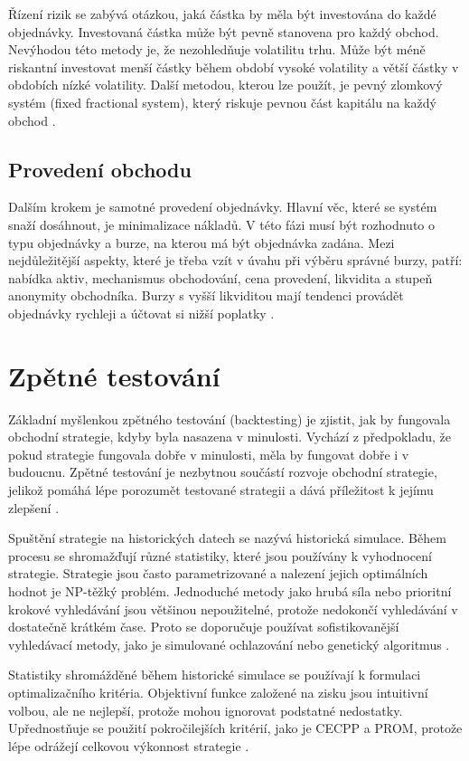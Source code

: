 Řízení rizik se zabývá otázkou, jaká částka by měla být investována do každé objednávky.
Investovaná částka může být pevně stanovena pro každý obchod.
Nevýhodou této metody je, že nezohledňuje volatilitu trhu.
Může být méně riskantní investovat menší částky během období vysoké volatility a větší částky v obdobích nízké volatility.
Další metodou, kterou lze použít, je pevný zlomkový systém (fixed fractional system), který riskuje pevnou část kapitálu na každý obchod \cite{nuti}.

\section{Provedení obchodu}
Dalším krokem je samotné provedení objednávky.
Hlavní věc, které se systém snaží dosáhnout, je minimalizace nákladů.
V této fázi musí být rozhodnuto o typu objednávky a burze, na kterou má být objednávka zadána.
Mezi nejdůležitější aspekty, které je třeba vzít v úvahu při výběru správné burzy, patří: nabídka aktiv, mechanismus obchodování, cena provedení, likvidita a stupeň anonymity obchodníka.
Burzy s vyšší likviditou mají tendenci provádět objednávky rychleji a účtovat si nižší poplatky \cite{nuti}.

\chapter{Zpětné testování}
Základní myšlenkou zpětného testování (backtesting) je zjistit, jak by fungovala obchodní strategie, kdyby byla nasazena v minulosti.
Vychází z předpokladu, že pokud strategie fungovala dobře v minulosti, měla by fungovat dobře i v budoucnu.
Zpětné testování je nezbytnou součástí rozvoje obchodní strategie, jelikož pomáhá lépe porozumět testované strategii a dává příležitost k jejímu zlepšení \cite{efficient-backtesting}.

Spuštění strategie na historických datech se nazývá historická simulace.
Během procesu se shromažďují různé statistiky, které jsou používány k vyhodnocení strategie.
Strategie jsou často parametrizované a nalezení jejich optimálních hodnot je NP-těžký problém.
Jednoduché metody jako hrubá síla nebo prioritní krokové vyhledávání jsou většinou nepoužitelné, protože nedokončí vyhledávání v dostatečně krátkém čase.
Proto se doporučuje používat sofistikovanější vyhledávací metody, jako je simulované ochlazování nebo genetický algoritmus
\cite{pardo, efficient-backtesting}.

Statistiky shromážděné během historické simulace se používají k formulaci optimalizačního kritéria.
Objektivní funkce založené na zisku jsou intuitivní volbou, ale ne nejlepší, protože mohou ignorovat podstatné nedostatky.
Upřednostňuje se použití pokročilejších kritérií, jako je CECPP a PROM, protože lépe odrážejí celkovou výkonnost strategie \cite{pardo}.

